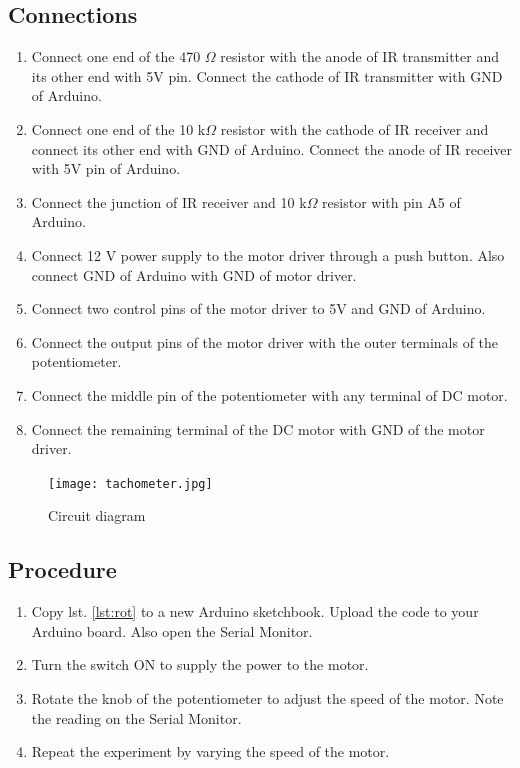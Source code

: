\subsection*{Connections}
\begin{enumerate}[leftmargin=*]
    \item Connect one end of the 470 $\Omega$ resistor with the anode of IR transmitter and its other end with 5V pin. Connect the cathode of IR transmitter with GND of Arduino.
    \item Connect one end of the 10 k$\Omega$ resistor with the cathode of IR receiver  and connect its other end with GND of Arduino. Connect the anode of IR receiver with 5V pin of Arduino.
    \item Connect the junction of IR receiver and 10 k$\Omega$ resistor with pin A5 of Arduino. 
    \item Connect 12 V power supply to the motor driver through a push button. Also connect GND of Arduino with GND of motor driver. 
    \item Connect two control pins of the motor driver to 5V and GND of Arduino.
    \item Connect the output pins of the motor driver with the outer terminals of the potentiometer. 
    \item Connect the middle pin of the potentiometer with any terminal of DC motor.
    \item Connect the remaining terminal of the DC motor with GND of the motor driver.
\end{enumerate}

	\begin{figure}[H]
	\centering \texttt{[image: tachometer.jpg]}
	\caption{Circuit diagram}
	\end{figure}

\subsection*{Procedure}
\begin{enumerate}[leftmargin=*]
     \item Copy lst. \ref{lst:rot} to a new Arduino sketchbook. Upload the code to your Arduino board. Also open the Serial Monitor.
    \item Turn the switch ON to supply the power to the motor.
    \item Rotate the knob of the potentiometer to adjust the speed of the motor. Note the reading on the Serial Monitor.
    \item Repeat the experiment by varying the speed of the motor.
\end{enumerate}

